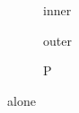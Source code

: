 \documentclass{article}
\begin{document}
\begin{figure}
\begin{minipage}{.5\linewidth}
\begin{program}[H] inner \caption{P}\end{program}
\end{minipage}
outer
\end{figure}
\begin{program}[H] alone \caption{P2}\end{program}
\end{document}
